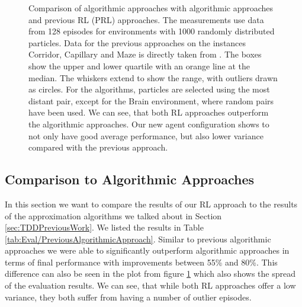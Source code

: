 \begin{figure}[htp]
\begin{center}
    \end{center}
    \caption[Comparison of Algorithmic Approaches with RL Approaches]{Comparison of algorithmic approaches with algorithmic approaches and previous RL (PRL) approaches. The measurements use data from 128 episodes for environments with 1000 randomly distributed particles. Data for the previous approaches on the instances Corridor, Capillary and Maze is directly taken from \cite{becker2020}. The boxes show the upper and lower quartile with an orange line at the median. The whiskers extend to show the range, with outliers drawn as circles. For the algorithms, particles are selected using the most distant pair, except for the Brain environment, where random pairs have been used. We can see, that both RL approaches outperform the algorithmic approaches. Our new agent configuration shows to not only have good average performance, but also lower variance compared with the previous approach.} \label{fig:Eval/Baseline/Boxplot}
\end{figure}

\subsection{Comparison to Algorithmic Approaches} \label{sec:EvalAlgorithms}
In this section we want to compare the results of our RL approach to the results of the approximation algorithms we talked about in Section \ref{sec:TDDPreviousWork}. We listed the results in Table \ref{tab:Eval/PreviousAlgorithmicApproach}. Similar to previous algorithmic approaches we were able to significantly outperform algorithmic approaches in terms of final performance with improvements between 55\% and 80\%. This difference can also be seen in the plot from figure \ref{fig:Eval/Baseline/Boxplot} which also shows the spread of the evaluation results. We can see, that while both RL approaches offer a low variance, they both suffer from having a number of outlier episodes. 

